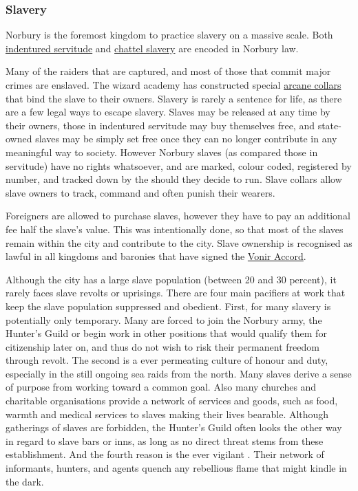 \subsubsection{Slavery}
\label{sec:Slavery in Norbury}

Norbury is the foremost kingdom to practice slavery on a massive scale. Both
\hyperref[sec:Indentured Servitude]{indentured servitude} and
\hyperref[sec:Unregulated Slavery]{chattel slavery} are encoded in Norbury
law.

Many of the raiders that are captured, and most of those that commit major
crimes are enslaved. The wizard academy has constructed special
\hyperref[sec:Slave Band]{arcane collars} that bind the slave to their
owners. Slavery is rarely a sentence for life, as there are a few legal ways to
escape slavery. Slaves may be released at any time by their owners, those in
indentured servitude may buy themselves free, and state-owned slaves may be
simply set free once they can no longer contribute in any meaningful way to
society. However Norbury slaves (as compared those in servitude) have no
rights whatsoever, and are marked, colour coded, registered by number, and
tracked down by the  should they decide to
run. Slave collars allow slave owners to track, command and often punish their
wearers.

Foreigners are allowed to purchase slaves, however they have to pay an
additional fee half the slave's value. This was intentionally done, so that
most of the slaves remain within the city and contribute to the city. Slave
ownership is recognised as lawful in all kingdoms and baronies that have
signed the \hyperref[sec:Vonir Accord]{Vonir Accord}.

Although the city has a large slave population (between 20 and 30 percent),
it rarely faces slave revolts or uprisings. There are four main pacifiers at
work that keep the slave population suppressed and obedient. First, for many
slavery is potentially only temporary. Many are forced to join the Norbury
army, the Hunter's Guild or begin work in other positions that would qualify
them for citizenship later on, and thus do not wish to risk their permanent
freedom through revolt. The second is a ever permeating culture of honour and
duty, especially in the still ongoing sea raids from the north. Many slaves
derive a sense of purpose from working toward a common goal. Also many
churches and charitable organisations provide a network of services and goods,
such as food, warmth and medical services to slaves making their lives
bearable. Although gatherings of slaves are forbidden, the Hunter's Guild
often looks the other way in regard to slave bars or inns, as long as no
direct threat stems from these establishment. And the fourth reason is the
ever vigilant . Their network of informants,
hunters, and agents quench any rebellious flame that might kindle in the dark.

